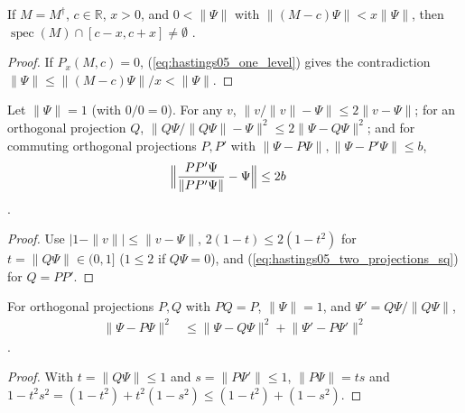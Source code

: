 \begin{lemma}
    \label{thm:hastings05_eigenvalue_in_window}
    \leanok
    If $M=M^\dagger$, $c\in\mathbb R$, $x>0$, and $0<\|\Psi\|$ with
    $\|(M-c)\Psi\|<x\|\Psi\|$, then $\operatorname{spec}(M)\cap[c-x,c+x]\ne\emptyset$
    \cite[lines 658--667]{Hastings2006Solving}.
\end{lemma}
\begin{proof}\leanok
    If $P_x(M,c)=0$, (\ref{eq:hastings05_one_level}) gives the contradiction
    $\|\Psi\|\le\|(M-c)\Psi\|/x<\|\Psi\|$.
\end{proof}

\begin{lemma}[Normalization]
    \label{thm:hastings05_normalization}
    \leanok
    Let $\|\Psi\|=1$ (with $0/0=0$). For any $v$,
    $\|v/\|v\|-\Psi\|\le2\|v-\Psi\|$; for an orthogonal projection $Q$,
    $\|Q\Psi/\|Q\Psi\|-\Psi\|^2\le2\|\Psi-Q\Psi\|^2$; and for commuting
    orthogonal projections $P,P'$ with $\|\Psi-P\Psi\|,\|\Psi-P'\Psi\|\le b$,
    \begin{align}
        \Bigl\lVert\frac{PP'\Psi}{\lVert PP'\Psi\rVert}-\Psi\Bigr\rVert
         & \le2b
        \label{eq:hastings05_normalization}
    \end{align}
    \cite[lines 686--689]{Hastings2006Solving}.
\end{lemma}
\begin{proof}\leanok
    Use $|1-\|v\||\le\|v-\Psi\|$, $2(1-t)\le2(1-t^2)$ for
    $t=\|Q\Psi\|\in(0,1]$ ($1\le2$ if $Q\Psi=0$), and
    (\ref{eq:hastings05_two_projections_sq}) for $Q=PP'$.
\end{proof}

\begin{lemma}
    \label{thm:hastings05_nested_projections}
    \leanok
    For orthogonal projections $P,Q$ with $PQ=P$, $\|\Psi\|=1$, and
    $\Psi'=Q\Psi/\|Q\Psi\|$,
    \begin{align}
        \lVert\Psi-P\Psi\rVert^2
         & \le\lVert\Psi-Q\Psi\rVert^2+\lVert\Psi'-P\Psi'\rVert^2
        \label{eq:hastings05_nested_projections}
    \end{align}
    \cite[lines 671--676]{Hastings2006Solving}.
\end{lemma}
\begin{proof}\leanok
    With $t=\|Q\Psi\|\le1$ and $s=\|P\Psi'\|\le1$, $\|P\Psi\|=ts$ and
    $1-t^2s^2=(1-t^2)+t^2(1-s^2)\le(1-t^2)+(1-s^2)$.
\end{proof}

